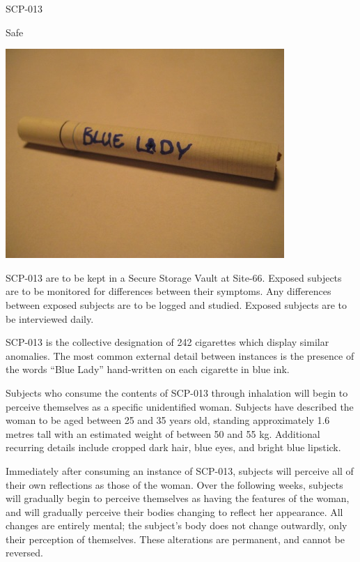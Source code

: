 
 SCP-013

 Safe

\begin{center}
\includegraphics[scale=1.4]{scp/013.jpg}
\end{center}

 SCP-013 are to be kept in a Secure Storage Vault at Site-66. Exposed subjects are to be monitored for differences between their symptoms. Any differences between exposed subjects are to be logged and studied. Exposed subjects are to be interviewed daily.

 SCP-013 is the collective designation of 242 cigarettes which display similar anomalies. The most common external detail between instances is the presence of the words “Blue Lady” hand-written on each cigarette in blue ink.

Subjects who consume the contents of SCP-013 through inhalation will begin to perceive themselves as a specific unidentified woman. Subjects have described the woman to be aged between 25 and 35 years old, standing approximately 1.6 metres tall with an estimated weight of between 50 and 55 kg. Additional recurring details include cropped dark hair, blue eyes, and bright blue lipstick.

Immediately after consuming an instance of SCP-013, subjects will perceive all of their own reflections as those of the woman. Over the following weeks, subjects will gradually begin to perceive themselves as having the features of the woman, and will gradually perceive their bodies changing to reflect her appearance. All changes are entirely mental; the subject’s body does not change outwardly, only their perception of themselves. These alterations are permanent, and cannot be reversed.

